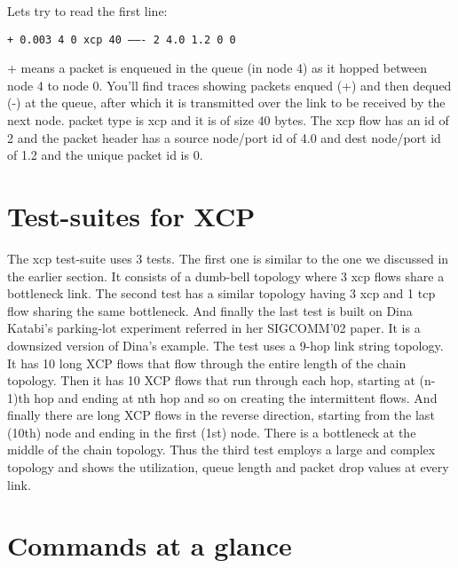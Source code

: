   Lets try to read the first line:

  {\tt + 0.003 4 0 xcp 40 ------- 2 4.0 1.2 0 0}
  
  + means a packet is enqueued in the queue (in node 4) as it hopped
  between node 4 to node 0. You'll find traces showing packets enqued
  (+) and then dequed (-) at the queue, after which it is transmitted
  over the link to be received by the next node. packet
  type is xcp and it is of size 40 bytes. The xcp flow has an id of 2
  and the packet header has a source node/port id of 4.0 and dest
  node/port id of 1.2 and the unique packet id is 0.
    
  \section{Test-suites for XCP}
  \label{sec:test for xcp}
  
  The xcp test-suite uses 3 tests. The first one is similar to the one
  we discussed in the earlier section. It consists of a dumb-bell
  topology where 3 xcp flows share a bottleneck link. The second test
  has a similar topology having 3 xcp and 1 tcp flow sharing the same
  bottleneck. And finally the last test is built on Dina Katabi's
  parking-lot experiment referred in her SIGCOMM'02 paper. It is a
  downsized version of Dina's example. The test uses a 9-hop
  link string topology. It has 10 long XCP flows that flow through the
  entire length of the chain topology. Then it has 10 XCP flows that run
  through each hop, starting at (n-1)th hop and ending at nth hop and so
  on creating the intermittent flows. And finally there are long XCP
  flows in the reverse direction, 
  starting from the last (10th) node and ending in the first (1st) node.
  There is a bottleneck at the middle of the chain topology. Thus the
  third test employs a large and complex topology and shows the
  utilization, queue length and packet drop values at every link.
  

  \section{Commands at a glance}
  \label{sec:commands-xcp}
  
